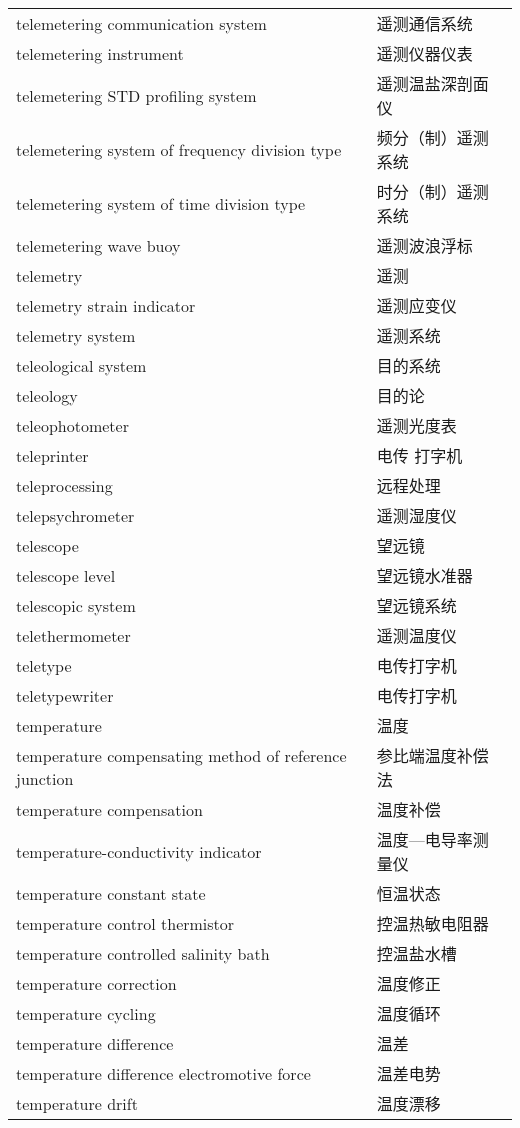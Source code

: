 \documentclass[
]{article}
\begin{document}
\begin{longtable}[]{@{}ll@{}}
telemetering communication system & 遥测通信系统 \\
telemetering instrument & 遥测仪器仪表 \\
telemetering STD profiling system & 遥测温盐深剖面仪 \\
telemetering system of frequency division type & 频分（制）遥测系统 \\
telemetering system of time division type & 时分（制）遥测系统 \\
telemetering wave buoy & 遥测波浪浮标 \\
telemetry & 遥测 \\
telemetry strain indicator & 遥测应变仪 \\
telemetry system & 遥测系统 \\
teleological system & 目的系统 \\
teleology & 目的论 \\
teleophotometer & 遥测光度表 \\
teleprinter & 电传 打字机 \\
teleprocessing & 远程处理 \\
telepsychrometer & 遥测湿度仪 \\
telescope & 望远镜 \\
telescope level & 望远镜水准器 \\
telescopic system & 望远镜系统 \\
telethermometer & 遥测温度仪 \\
teletype & 电传打字机 \\
teletypewriter & 电传打字机 \\
temperature & 温度 \\
temperature compensating method of reference junction &
参比端温度补偿法 \\
temperature compensation & 温度补偿 \\
temperature-conductivity indicator & 温度---电导率测量仪 \\
temperature constant state & 恒温状态 \\
temperature control thermistor & 控温热敏电阻器 \\
temperature controlled salinity bath & 控温盐水槽 \\
temperature correction & 温度修正 \\
temperature cycling & 温度循环 \\
temperature difference & 温差 \\
temperature difference electromotive force & 温差电势 \\
temperature drift & 温度漂移 \\

\end{longtable}
\end{document}
